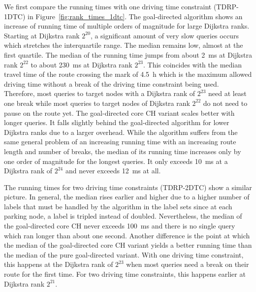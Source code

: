 We first compare the running times with one driving time constraint (TDRP-1DTC) in Figure~\ref{fig:rank_times_1dtc}. The goal-directed algorithm shows an increase of running time of multiple orders of magnitude for large Dijkstra ranks. Starting at Dijkstra rank $2^{20}$, a significant amount of very slow queries occurs which stretches the interquartile range. The median remains low, almost at the first quartile. The median of the running time jumps from about \SI{2}{\milli\second} at Dijkstra rank $2^{22}$ to about \SI{230}{\milli\second} at Dijkstra rank $2^{23}$. This coincides with the median travel time of the route crossing the mark of \SI{4.5}{\hour} which is the maximum allowed driving time without a break of the driving time constraint being used. Therefore, most queries to target nodes with a Dijkstra rank of $2^{23}$ need at least one break while most queries to target nodes of Dijkstra rank $2^{22}$ do not need to pause on the route yet. The goal-directed core CH variant scales better with longer queries. It falls slightly behind the goal-directed algorithm for lower Dijkstra ranks due to a larger overhead. While the algorithm suffers from the same general problem of an increasing running time with an increasing route length and number of breaks, the median of its running time increases only by one order of magnitude for the longest queries. It only exceeds \SI{10}{\milli\second} at a Dijkstra rank of $2^{24}$ and never exceeds \SI{12}{\milli\second} at all.

The running times for two driving time constraints (TDRP-2DTC) show a similar picture. In general, the median rises earlier and higher due to a higher number of labels that must be handled by the algorithm in the label sets since at each parking node, a label is tripled instead of doubled. Nevertheless, the median of the goal-directed core CH never exceeds \SI{100}{\milli\second} and there is no single query which ran longer than about one second. Another difference is the point at which the median of the goal-directed core CH variant yields a better running time than the median of the pure goal-directed variant. With one driving time constraint, this happens at the Dijkstra rank of $2^{23}$ when most queries need a break on their route for the first time. For two driving time constraints, this happens earlier at Dijkstra rank $2^{21}$.

